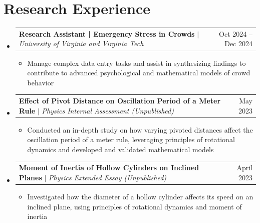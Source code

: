 \documentclass[a4paper,11pt]{article}
\makeatletter
\newcommand{\resumeItem}[1]{
  \item\small{
    {#1 \vspace{-2pt}}
  }
}
\newcommand{\resumeProjectHeading}[2]{
    \item
    \begin{tabular*}{0.97\textwidth}{l@{\extracolsep{\fill}}r}
      \small#1 & #2 \\
    \end{tabular*}\vspace{-7pt}
}
\newcommand{\resumeSubHeadingListStart}{\begin{itemize}[leftmargin=0.15in, label={}]}
\newcommand{\resumeSubHeadingListEnd}{\end{itemize}}
\newcommand{\resumeItemListStart}{\begin{itemize}}
\newcommand{\resumeItemListEnd}{\end{itemize}\vspace{-8pt}} %
\makeatother
\begin{document}
\section{Research Experience}
  \resumeSubHeadingListStart
      \resumeProjectHeading
        {\textbf{Research Assistant | Emergency Stress in Crowds} $|$ \emph{University of Virginia and Virginia Tech}} {Oct 2024 -- Dec 2024}
        \resumeItemListStart
         \resumeItem{Manage complex data entry tasks and assist in synthesizing findings to contribute to advanced psychological and mathematical models of crowd behavior}
        \resumeItemListEnd
      \resumeProjectHeading
        {\textbf{Effect of Pivot Distance on Oscillation Period of a Meter Rule} $|$ \emph{Physics Internal Assessment (Unpublished)}} {May 2023}
        \resumeItemListStart
         \resumeItem{Conducted an in-depth study on how varying pivoted distances affect the oscillation period of a meter rule, leveraging principles of rotational dynamics and developed and validated mathematical models}
        \resumeItemListEnd
      \resumeProjectHeading
        {\textbf{Moment of Inertia of Hollow Cylinders on Inclined Planes} $|$ \emph{Physics Extended Essay (Unpublished)}} {April 2023}
        \resumeItemListStart
         \resumeItem{Investigated how the diameter of a hollow cylinder affects its speed on an inclined plane, using principles of rotational dynamics and moment of inertia}
        \resumeItemListEnd
  \resumeSubHeadingListEnd
\end{document}
